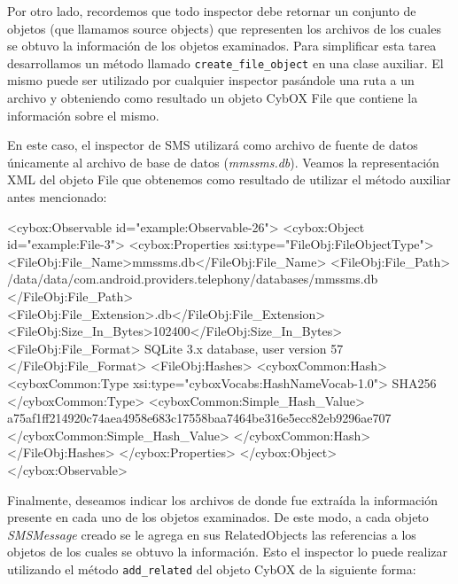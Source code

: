 Por otro lado, recordemos que todo inspector debe retornar un conjunto de objetos (que llamamos source objects) que representen los archivos de los cuales se obtuvo la información de los objetos examinados. Para simplificar esta tarea desarrollamos un método llamado \texttt{create\_file\_object} en una clase auxiliar. El mismo puede ser utilizado por cualquier inspector pasándole una ruta a un archivo y obteniendo como resultado un objeto CybOX File que contiene la información sobre el mismo.

En este caso, el inspector de SMS utilizará como archivo de fuente de datos únicamente al archivo de base de datos (\emph{mmssms.db}). Veamos la representación XML del objeto File que obtenemos como resultado de utilizar el método auxiliar antes mencionado:
\newline

\begin{xml} 
<cybox:Observable id="example:Observable-26">
    <cybox:Object id="example:File-3">
        <cybox:Properties xsi:type="FileObj:FileObjectType">
            <FileObj:File_Name>mmssms.db</FileObj:File_Name>
            <FileObj:File_Path>
/data/data/com.android.providers.telephony/databases/mmssms.db
            </FileObj:File_Path>
            <FileObj:File_Extension>.db</FileObj:File_Extension>
            <FileObj:Size_In_Bytes>102400</FileObj:Size_In_Bytes>
            <FileObj:File_Format>
                SQLite 3.x database, user version 57
            </FileObj:File_Format>
            <FileObj:Hashes>
                <cyboxCommon:Hash>
                    <cyboxCommon:Type xsi:type="cyboxVocabs:HashNameVocab-1.0">
                        SHA256
                    </cyboxCommon:Type>
                    <cyboxCommon:Simple_Hash_Value>
a75af1ff214920c74aea4958e683c17558baa7464be316e5ecc82eb9296ae707
                    </cyboxCommon:Simple_Hash_Value>
                </cyboxCommon:Hash>
            </FileObj:Hashes>
        </cybox:Properties>
    </cybox:Object>
</cybox:Observable>
\end{xml}

Finalmente, deseamos indicar los archivos de donde fue extraída la información presente en cada uno de los objetos examinados. De este modo, a cada objeto \emph{SMSMessage} creado se le agrega en sus RelatedObjects las referencias a los objetos de los cuales se obtuvo la información. Esto el inspector lo puede realizar utilizando el método \texttt{add\_related} del objeto CybOX de la siguiente forma:
\newline


